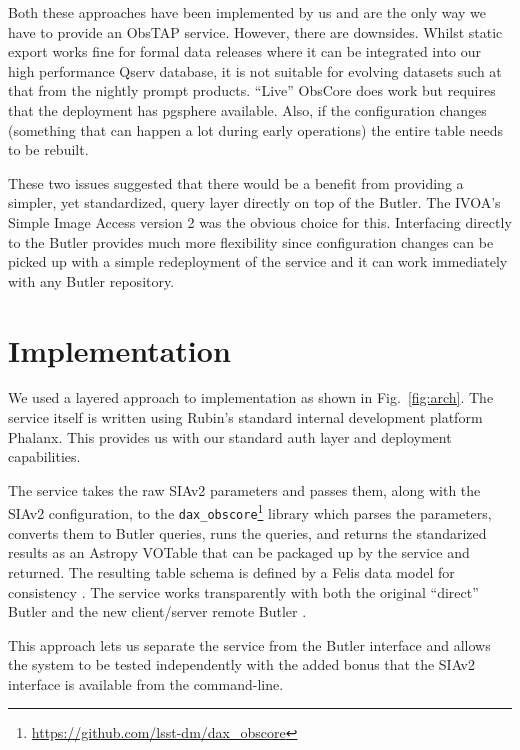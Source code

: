 \documentclass[11pt,twoside]{article}
\begin{document}
Both these approaches have been implemented by us and are the only way we have to provide an ObsTAP service. However, there are downsides.
Whilst static export works fine for formal data releases where it can be integrated into our high performance Qserv database, it is not suitable for evolving datasets such at that from the nightly prompt products.
``Live'' ObsCore does work but requires that the deployment has pgsphere available. Also, if the configuration changes (something that can happen a lot during early operations) the entire table needs to be rebuilt.

These two issues suggested that there would be a benefit from providing a simpler, yet standardized, query layer directly on top of the Butler. The IVOA's Simple Image Access version 2 \citep[SIAv2;][]{2015ivoa.spec.1223D} was the obvious choice for this. Interfacing directly to the Butler provides much more flexibility since configuration changes can be picked up with a simple redeployment of the service and it can work immediately with any Butler repository.

\section{Implementation}


We used a layered approach to implementation as shown in Fig.\ \ref{fig:arch}.
The service itself \citep{SQR-095} is written using Rubin's standard internal development platform Phalanx.
This provides us with our standard auth layer and deployment capabilities.

The service takes the raw SIAv2 parameters and passes them, along with the SIAv2 configuration, to the \texttt{dax\_obscore}\footnote{\url{https://github.com/lsst-dm/dax_obscore}} library which parses the parameters, converts them to Butler queries, runs the queries, and returns the standarized results as an Astropy VOTable that can be packaged up by the service and returned.
The resulting table schema is defined by a Felis data model for consistency \citep{C702_adassxxxiv}.
The service works transparently with both the original ``direct'' Butler and the new client/server remote Butler \citep{2024SPIE13101E..3GJ}.

This approach lets us separate the service from the Butler interface and allows the system to be tested independently with the added bonus that the SIAv2 interface is available from the command-line.
\end{document}
